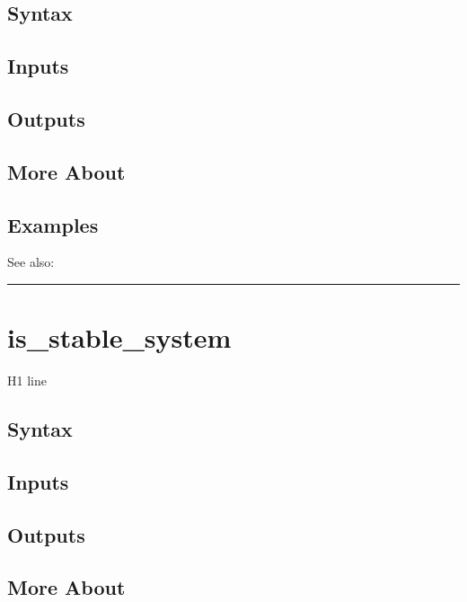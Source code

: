 \documentclass[letterpaper,10pt,english]{sphinxmanual}
\begin{document}
\subsection{Syntax}
\label{classes/models/@dsge/dsge:id78}

\subsection{Inputs}
\label{classes/models/@dsge/dsge:id79}

\subsection{Outputs}
\label{classes/models/@dsge/dsge:id80}

\subsection{More About}
\label{classes/models/@dsge/dsge:id81}

\subsection{Examples}
\label{classes/models/@dsge/dsge:id82}
See also:


\bigskip\hrule{}\bigskip



\section{is\_stable\_system}
\label{classes/models/@dsge/dsge:id83}\label{classes/models/@dsge/dsge:is-stable-system}
H1 line


\subsection{Syntax}
\label{classes/models/@dsge/dsge:id84}

\subsection{Inputs}
\label{classes/models/@dsge/dsge:id85}

\subsection{Outputs}
\label{classes/models/@dsge/dsge:id86}

\subsection{More About}
\label{classes/models/@dsge/dsge:id87}
\end{document}
